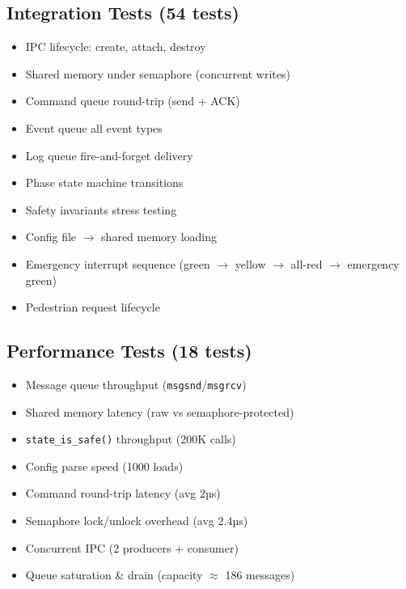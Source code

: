 \documentclass[11pt,a4paper]{article}
\begin{document}
\subsection{Integration Tests (54 tests)}
\begin{itemize}[noitemsep]
    \item IPC lifecycle: create, attach, destroy
    \item Shared memory under semaphore (concurrent writes)
    \item Command queue round-trip (send + ACK)
    \item Event queue all event types
    \item Log queue fire-and-forget delivery
    \item Phase state machine transitions
    \item Safety invariants stress testing
    \item Config file $\rightarrow$ shared memory loading
    \item Emergency interrupt sequence (green $\rightarrow$ yellow $\rightarrow$ all-red $\rightarrow$ emergency green)
    \item Pedestrian request lifecycle
\end{itemize}

\subsection{Performance Tests (18 tests)}
\begin{itemize}[noitemsep]
    \item Message queue throughput (\texttt{msgsnd}/\texttt{msgrcv})
    \item Shared memory latency (raw vs semaphore-protected)
    \item \texttt{state\_is\_safe()} throughput (200K calls)
    \item Config parse speed (1000 loads)
    \item Command round-trip latency (avg 2µs)
    \item Semaphore lock/unlock overhead (avg 2.4µs)
    \item Concurrent IPC (2 producers + consumer)
    \item Queue saturation \& drain (capacity $\approx$ 186 messages)
\end{itemize}
\end{document}
